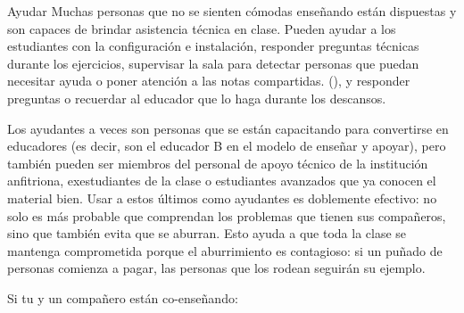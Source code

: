 \begin{aside}{Ayudar}
  Muchas personas que no se sienten cómodas enseñando
  están dispuestas y son capaces de brindar asistencia técnica en clase.
  Pueden ayudar a los estudiantes con la configuración e instalación,
  responder preguntas técnicas durante los ejercicios,
  supervisar la sala para detectar personas que puedan necesitar ayuda
  o poner atención a las notas compartidas. (),
  y responder preguntas
  o recuerdar al educador que lo haga durante los descansos.

  Los ayudantes a veces son personas que se están capacitando para convertirse en educadores
  (es decir, son el educador B en el modelo de enseñar y apoyar),
  pero también pueden ser miembros del personal de apoyo técnico de la institución anfitriona,
  exestudiantes de la clase
  o estudiantes avanzados que ya conocen el material bien.
  Usar a estos últimos como ayudantes es doblemente efectivo: no solo es más probable que comprendan los problemas que tienen sus compañeros,
  sino que también evita que se aburran.
  Esto ayuda a que toda la clase se mantenga comprometida porque el aburrimiento es contagioso:
  si un puñado de personas comienza a pagar,
  las personas que los rodean seguirán su ejemplo.
\end{aside}

Si tu y un compañero están co-enseñando:

